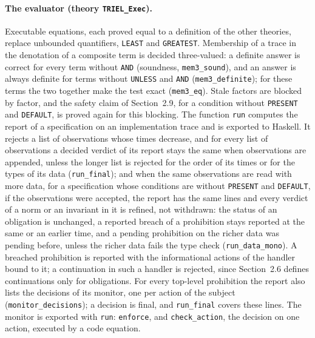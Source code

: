\documentclass[11pt,a4paper]{article}
\begin{document}
\paragraph{The evaluator (theory \texttt{TRIEL\_Exec}).}
Executable equations, each proved equal to a definition of the other theories, replace
unbounded quantifiers, \texttt{LEAST} and \texttt{GREATEST}. Membership of a trace in the
denotation of a composite term is decided three-valued: a definite answer is correct for
every term without \texttt{AND} (soundness, \texttt{mem3\_sound}), and an answer is
always definite for terms without \texttt{UNLESS} and \texttt{AND}
(\texttt{mem3\_definite}); for these terms the two together make the test exact
(\texttt{mem3\_eq}). Stale factors are blocked by factor, and the safety
claim of Section~2.9, for a condition without \texttt{PRESENT} and \texttt{DEFAULT}, is proved
again for this blocking. The function \texttt{run}
computes the report of a specification on an implementation trace and is exported to
Haskell. It rejects a list of observations whose times decrease, and for every list of
observations a decided verdict of its report stays the same when observations are
appended, unless the longer list is rejected for the order of its times or for the types
of its data (\texttt{run\_final}); and when the same observations are read with more
data, for a specification whose conditions are without \texttt{PRESENT} and
\texttt{DEFAULT}, if the observations were accepted, the report has the same lines and every verdict of a norm or an invariant in it is refined, not
withdrawn: the status of an obligation is unchanged, a reported breach of a prohibition
stays reported at the same or an earlier time, and a pending prohibition on the richer
data was pending before, unless the richer data fails the type check
(\texttt{run\_data\_mono}). A breached prohibition is reported with the informational actions of the handler
bound to it; a continuation in such a handler is rejected, since Section~2.6 defines
continuations only for obligations. For every top-level prohibition the report also lists
the decisions of its monitor, one per action of the subject (\texttt{monitor\_decisions});
a decision is final, and \texttt{run\_final} covers these lines. The monitor is
exported with \texttt{run}: \texttt{enforce}, and \texttt{check\_action}, the decision on
one action, executed by a code equation.
\end{document}
